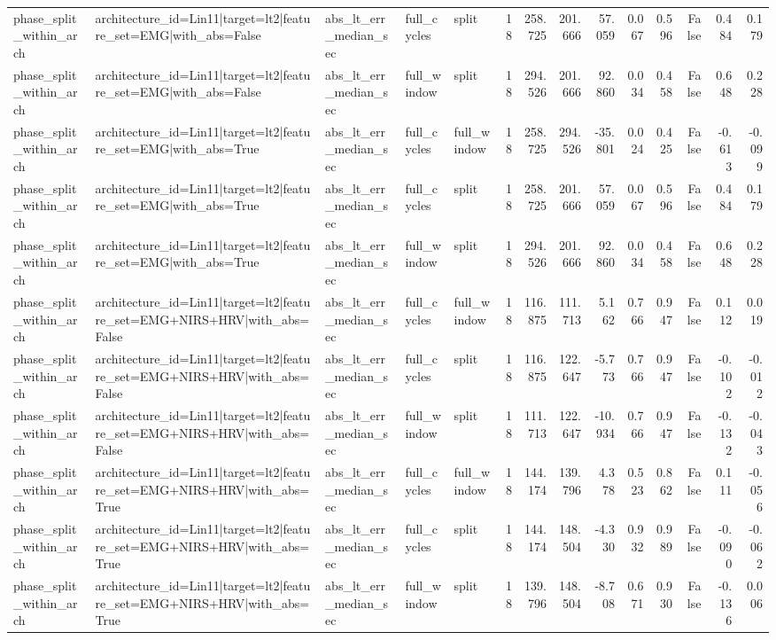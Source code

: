 \begin{table}
\begin{tabular}{lllllrrrrrrrrr}
phase_split_within_arch & architecture_id=Lin11|target=lt2|feature_set=EMG|with_abs=False & abs_lt_err_median_sec & full_cycles & split & 18 & 258.725 & 201.666 & 57.059 & 0.067 & 0.596 & False & 0.484 & 0.179 \\
phase_split_within_arch & architecture_id=Lin11|target=lt2|feature_set=EMG|with_abs=False & abs_lt_err_median_sec & full_window & split & 18 & 294.526 & 201.666 & 92.860 & 0.034 & 0.458 & False & 0.648 & 0.228 \\
phase_split_within_arch & architecture_id=Lin11|target=lt2|feature_set=EMG|with_abs=True & abs_lt_err_median_sec & full_cycles & full_window & 18 & 258.725 & 294.526 & -35.801 & 0.024 & 0.425 & False & -0.613 & -0.099 \\
phase_split_within_arch & architecture_id=Lin11|target=lt2|feature_set=EMG|with_abs=True & abs_lt_err_median_sec & full_cycles & split & 18 & 258.725 & 201.666 & 57.059 & 0.067 & 0.596 & False & 0.484 & 0.179 \\
phase_split_within_arch & architecture_id=Lin11|target=lt2|feature_set=EMG|with_abs=True & abs_lt_err_median_sec & full_window & split & 18 & 294.526 & 201.666 & 92.860 & 0.034 & 0.458 & False & 0.648 & 0.228 \\
phase_split_within_arch & architecture_id=Lin11|target=lt2|feature_set=EMG+NIRS+HRV|with_abs=False & abs_lt_err_median_sec & full_cycles & full_window & 18 & 116.875 & 111.713 & 5.162 & 0.766 & 0.947 & False & 0.112 & 0.019 \\
phase_split_within_arch & architecture_id=Lin11|target=lt2|feature_set=EMG+NIRS+HRV|with_abs=False & abs_lt_err_median_sec & full_cycles & split & 18 & 116.875 & 122.647 & -5.773 & 0.766 & 0.947 & False & -0.102 & -0.012 \\
phase_split_within_arch & architecture_id=Lin11|target=lt2|feature_set=EMG+NIRS+HRV|with_abs=False & abs_lt_err_median_sec & full_window & split & 18 & 111.713 & 122.647 & -10.934 & 0.766 & 0.947 & False & -0.132 & -0.043 \\
phase_split_within_arch & architecture_id=Lin11|target=lt2|feature_set=EMG+NIRS+HRV|with_abs=True & abs_lt_err_median_sec & full_cycles & full_window & 18 & 144.174 & 139.796 & 4.378 & 0.523 & 0.862 & False & 0.111 & -0.056 \\
phase_split_within_arch & architecture_id=Lin11|target=lt2|feature_set=EMG+NIRS+HRV|with_abs=True & abs_lt_err_median_sec & full_cycles & split & 18 & 144.174 & 148.504 & -4.330 & 0.932 & 0.989 & False & -0.090 & -0.062 \\
phase_split_within_arch & architecture_id=Lin11|target=lt2|feature_set=EMG+NIRS+HRV|with_abs=True & abs_lt_err_median_sec & full_window & split & 18 & 139.796 & 148.504 & -8.708 & 0.671 & 0.930 & False & -0.136 & 0.006 \\

\end{tabular}
\end{table}
